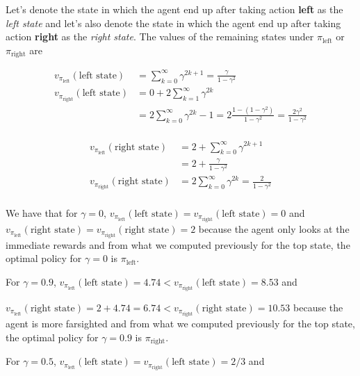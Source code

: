 \documentclass[10pt,a4paper]{article}
\begin{document}
Let's denote the state in which the agent end up after taking action \textbf{left} as the \textit{left state} and let's also denote the state in which the agent end up after taking action \textbf{right} as the \textit{right state}. The values of the remaining states under $\pi_\textrm{left}$ or $\pi_\textrm{right}$ are

\begin{equation}
\begin{split}
v_{\pi_\textrm{left}}(\textrm{left state}) &= \sum_{k=0}^\infty \gamma^{2k + 1} = \frac{\gamma}{1-\gamma^2}\\
v_{\pi_\textrm{right}}(\textrm{left state}) &= 0 + 2\sum_{k=1}^\infty \gamma^{2k}\\
& = 2\sum_{k=0}^\infty \gamma^{2k} - 1 = 2\frac{1 - (1-\gamma^2)}{1-\gamma^2} = \frac{2 \gamma^2}{1-\gamma^2}\\
\end{split}
\end{equation}


\begin{equation}
\begin{split}
v_{\pi_\textrm{left}}(\textrm{right state}) &= 2 + \sum_{k=0}^\infty \gamma^{2k + 1}\\
& = 2 + \frac{\gamma}{1 - \gamma^2}\\
v_{\pi_\textrm{right}}(\textrm{right state}) &= 2\sum_{k=0}^\infty \gamma^{2k} = \frac{2}{1-\gamma^2}\\
\end{split}
\end{equation}

We have that for $\gamma = 0$, $v_{\pi_\textrm{left}}(\textrm{left state}) = v_{\pi_\textrm{right}}(\textrm{left state})= 0$ and $v_{\pi_\textrm{left}}(\textrm{right state}) = v_{\pi_\textrm{right}}(\textrm{right state})= 2$ because the agent only looks at the immediate rewards and from what we computed previously for the top state, the optimal policy for $\gamma=0$ is $\pi_\textrm{left}$.

For $\gamma = 0.9$, $v_{\pi_\textrm{left}}(\textrm{left state}) = 4.74 < v_{\pi_\textrm{right}}(\textrm{left state})= 8.53$ and

$v_{\pi_\textrm{left}}(\textrm{right state}) = 2 + 4.74 = 6.74 < v_{\pi_\textrm{right}}(\textrm{right state})= 10.53$ because the agent is more farsighted and from what we computed previously for the top state, the optimal policy for $\gamma=0.9$ is $\pi_\textrm{right}$.

For $\gamma = 0.5$, $v_{\pi_\textrm{left}}(\textrm{left state}) = v_{\pi_\textrm{right}}(\textrm{left state})= 2/3$ and
\end{document}
